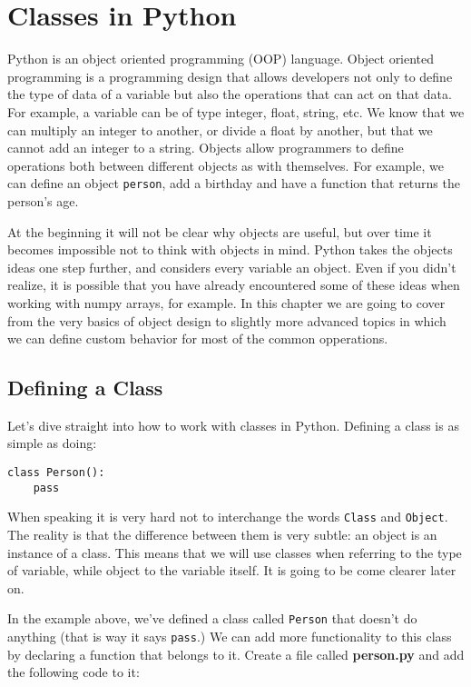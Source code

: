 \chapter{Classes in Python}\label{classes-in-python}
Python is an object oriented programming (OOP) language. Object oriented
programming is a programming design that allows developers not only to
define the type of data of a variable but also the operations that can
act on that data. For example, a variable can be of type integer, float,
string, etc. We know that we can multiply an integer to another, or
divide a float by another, but that we cannot add an integer to a
string. Objects allow programmers to define operations both between
different objects as with themselves. For example, we can define an object
\texttt{person}, add a birthday and have a function that returns the
person's age.

At the beginning it will not be clear why objects are useful, but over
time it becomes impossible not to think with objects in mind. Python
takes the objects ideas one step further, and considers every variable
an object. Even if you didn't realize, it is possible that you have
already encountered some of these ideas when working with numpy arrays,
for example. In this chapter we are going to cover from the very basics
of object design to slightly more advanced topics in which we can define
custom behavior for most of the common opperations.

\section{Defining a Class}\label{defining-a-class}
Let's dive straight into how to work with classes in Python. Defining a class is as
simple as doing:

\begin{verbatim}
class Person():
    pass
\end{verbatim}

When speaking it is very hard not to interchange the words
\texttt{Class} and \texttt{Object}. The reality is that the difference
between them is very subtle: an object is an instance of a class. This
means that we will use classes when referring to the type of variable,
while object to the variable itself. It is going to be come clearer
later on.

In the example above, we've defined a class called \texttt{Person} that doesn't do
anything (that is way it says \texttt{pass}.) We can add more
functionality to this class by declaring a function that belongs to it. Create a file called \textbf{person.py} and add the following code to it:


